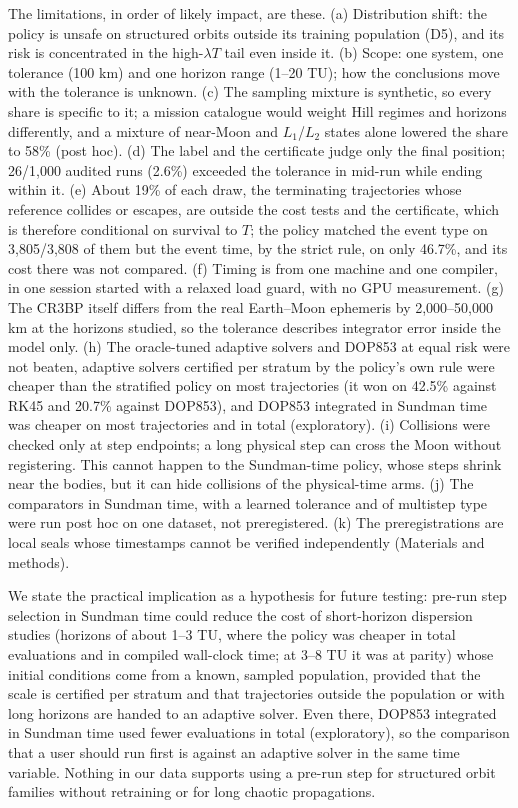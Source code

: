 \documentclass[10pt,letterpaper]{article}
\begin{document}
The limitations, in order of likely impact, are these. (a) Distribution shift: the policy is unsafe on structured orbits outside its training population (D5), and its risk is concentrated in the high-$\lambda T$ tail even inside it. (b) Scope: one system, one tolerance (100 km) and one horizon range (1--20 TU); how the conclusions move with the tolerance is unknown. (c) The sampling mixture is synthetic, so every share is specific to it; a mission catalogue would weight Hill regimes and horizons differently, and a mixture of near-Moon and $L_1$/$L_2$ states alone lowered the share to 58\% (post hoc). (d) The label and the certificate judge only the final position; 26/1,000 audited runs (2.6\%) exceeded the tolerance in mid-run while ending within it. (e) About 19\% of each draw, the terminating trajectories whose reference collides or escapes, are outside the cost tests and the certificate, which is therefore conditional on survival to $T$; the policy matched the event type on 3,805/3,808 of them but the event time, by the strict rule, on only 46.7\%, and its cost there was not compared. (f) Timing is from one machine and one compiler, in one session started with a relaxed load guard, with no GPU measurement. (g) The CR3BP itself differs from the real Earth--Moon ephemeris by 2,000--50,000 km at the horizons studied, so the tolerance describes integrator error inside the model only. (h) The oracle-tuned adaptive solvers and DOP853 at equal risk were not beaten, adaptive solvers certified per stratum by the policy's own rule were cheaper than the stratified policy on most trajectories (it won on 42.5\% against RK45 and 20.7\% against DOP853), and DOP853 integrated in Sundman time was cheaper on most trajectories and in total (exploratory). (i) Collisions were checked only at step endpoints; a long physical step can cross the Moon without registering. This cannot happen to the Sundman-time policy, whose steps shrink near the bodies, but it can hide collisions of the physical-time arms. (j) The comparators in Sundman time, with a learned tolerance and of multistep type were run post hoc on one dataset, not preregistered. (k) The preregistrations are local seals whose timestamps cannot be verified independently (Materials and methods).

We state the practical implication as a hypothesis for future testing: pre-run step selection in Sundman time could reduce the cost of short-horizon dispersion studies (horizons of about 1--3 TU, where the policy was cheaper in total evaluations and in compiled wall-clock time; at 3--8 TU it was at parity) whose initial conditions come from a known, sampled population, provided that the scale is certified per stratum and that trajectories outside the population or with long horizons are handed to an adaptive solver. Even there, DOP853 integrated in Sundman time used fewer evaluations in total (exploratory), so the comparison that a user should run first is against an adaptive solver in the same time variable. Nothing in our data supports using a pre-run step for structured orbit families without retraining or for long chaotic propagations.
\end{document}
